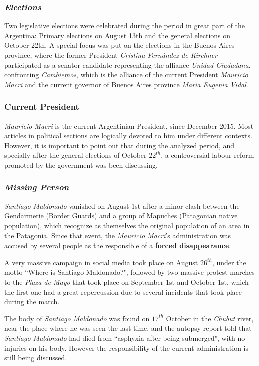 \documentclass{bmcart}
\begin{document}
\subsubsection*{\emph{Elections}}
\par Two legislative elections were celebrated during the period in great part of the Argentina: Primary elections on August 13th and the general elections on October 22th. 
A special focus was put on the elections in the Buenos Aires province, where the former President \emph{Cristina Fern\'andez de Kirchner} participated as a senator candidate representing the alliance \emph{Unidad Ciudadana}, confronting \emph{Cambiemos}, which is the alliance of the current President \emph{Mauricio Macri} and the current governor of Buenos Aires province \emph{Maria Eugenia Vidal}.
 
\subsubsection*{Current President}
\par \emph{Mauricio Macri} is the current Argentinian President, since December 2015. 
Most articles in political sections are logically devoted to him under different contexts.
However, it is important to point out that during the analyzed period, and specially after the general elections of October $22^{th}$, a controversial labour reform promoted by the government was been discussing.

\subsubsection*{\emph{Missing Person}}
\par \emph{Santiago Maldonado} vanished on August 1st after a minor clash between the Gendarmerie (Border Guards) and a group of Mapuches (Patagonian native population), which recognize as themselves the original population of an area in the Patagonia.
Since that event, the \emph{Mauricio Macri}'s administration was accused by several people as the responsible of a \textbf{forced disappearance}. 
\par A very massive campaign in social media took place on August $26^{th}$, under the motto ``Where is Santiago Maldonado?", followed by two massive protest marches to the \emph{Plaza de Mayo} that took place on September 1st and October 1st, which the first one had a great repercussion due to several incidents that took place during the march.
\par The body of \emph{Santiago Maldonado} was found on $17^{th}$ October in the \emph{Chubut} river, near the place where he was seen the last time, and the autopsy report told that \emph{Santiago Maldonado} had died from ``asphyxia after being submerged", with no injuries on his body. 
However the responsibility of the current administration is still being discussed.
\end{document}
